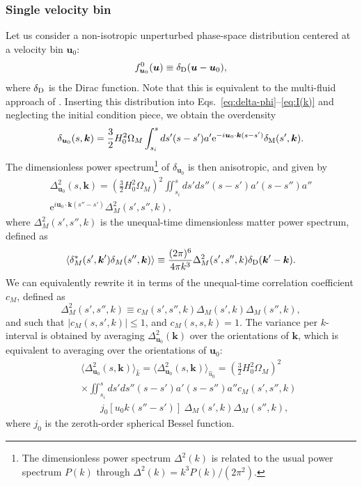 \documentclass[useAMS, usenatbib]{mnras}
\newcommand{\beq}{\begin{equation}}
\newcommand{\eeq}{\end{equation}}
\newcommand{\barr}{\begin{eqnarray}}
\newcommand{\earr}{\end{eqnarray}}
\newcommand{\rme}{\textrm{e}}
\newcommand{\bs}{\boldsymbol}
\begin{document}
\subsubsection{Single velocity bin} \label{sec:single-bin}


Let us consider a non-isotropic unperturbed phase-space distribution centered at a velocity bin $\bs{u}_0$:
\beq
f^0_{\bs{u}_0}(\bs{u}) \equiv \delta_{\rm D}(\bs{u}- \bs{u}_0),
\eeq
where $\delta_{\rm D}$ is the Dirac function. Note that this is equivalent to the multi-fluid approach of \cite{Dupuy_14}. Inserting this distribution into Eqs.~\eqref{eq:delta-phi}--\eqref{eq:I(k)} and neglecting the initial condition piece, we obtain the overdensity
\barr
\delta_{\bs{u}_0}(s, \bs{k}) = \frac32 H_0^2 \Omega_M \int_{s_i}^s ds' (s - s') a' \rme^{- i \bs{u}_0 \cdot \bs{k} (s - s')} \delta_{\rm M}(s', \bs{k}).
\earr
The dimensionless power spectrum\footnote{The dimensionless power spectrum $\Delta^2(k)$ is related to the usual power spectrum $P(k)$ through $\Delta^2(k) = k^3 P(k)/(2 \pi^2)$.} of $\delta_{\bs{u}_0}$ is then anisotropic, and given by
\barr
\Delta^2_{\bs{u}_0}(s, \bs{k}) =\left(\frac32 H_0^2 \Omega_M\right)^2 \iint_{s_i}^s ds' ds'' (s - s') a' (s - s'') a'' \nonumber\\
\rme^{i \bs{u}_0 \cdot \bs{k} (s'' - s')} \Delta^2_M(s', s'', k), \label{eq:P_u0}
\earr
where $\Delta^2_M(s', s'', k)$ is the unequal-time dimensionless matter power spectrum, defined as
\barr
\langle \delta_M^*(s',\bs{k}')\delta_M(s'',\bs{k})\rangle \equiv \frac{(2 \pi)^6}{4 \pi k^3} \Delta^2_M(s', s'', k) \delta_{\rm D}(\bs{k}' - \bs{k}).
\earr
We can equivalently rewrite it in terms of the unequal-time correlation coefficient $c_M$, defined as
\beq
\Delta^2_M(s', s'', k) \equiv c_M(s', s'', k) \Delta_M(s', k) \Delta_M(s'', k),
\eeq
and such that $|c_M(s, s', k)| \leq 1$, and $c_M(s, s, k) = 1$. The variance per $k$-interval is obtained by averaging $\Delta^2_{\bs{u}_0}(\bs{k})$ over the orientations of $\bs{k}$, which is equivalent to averaging over the orientations of $\bs{u}_0$:
\barr
&&\langle \Delta^2_{\bs{u}_0}(s, \bs{k})\rangle_{\hat{k}} = \langle \Delta^2_{\bs{u}_0}(s, \bs{k})\rangle_{\hat{u}_0} = \left(\frac32 H_0^2 \Omega_M\right)^2  \nonumber\\
&&\times \iint_{s_i}^s ds' ds'' (s - s') a' (s - s'') a'' c_M(s', s'', k) \nonumber\\
&&~~~~~~~~~ j_0[u_0 k (s'' - s')]~  \Delta_M (s', k) \Delta_M(s'', k), \label{eq:P_u0-av}
\earr
where $j_0$ is the zeroth-order spherical Bessel function.
\end{document}
